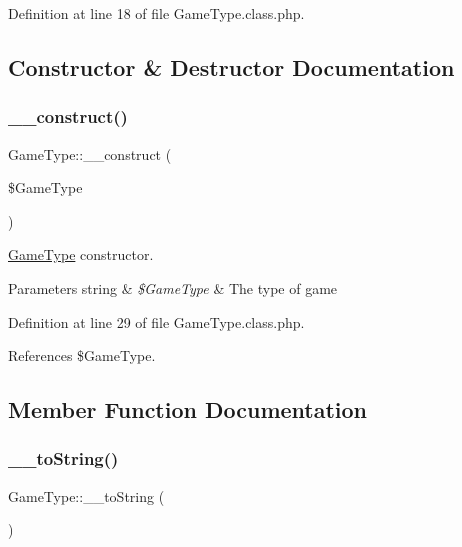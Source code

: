 Definition at line 18 of file Game\+Type.\+class.\+php.



\subsection{Constructor \& Destructor Documentation}
\mbox{\label{class_game_type_acd416aa9bf73a602044ca77ff9af7075}} 
\subsubsection{\texorpdfstring{\+\_\+\+\_\+construct()}{\_\_construct()}}
{\footnotesize\ttfamily Game\+Type\+::\+\_\+\+\_\+construct (\begin{DoxyParamCaption}\item[{}]{\$\+Game\+Type }\end{DoxyParamCaption})}

\hyperlink{class_game_type}{Game\+Type} constructor. 
\begin{DoxyParams}[1]{Parameters}
string & {\em \$\+Game\+Type} & The type of game \\
\hline
\end{DoxyParams}


Definition at line 29 of file Game\+Type.\+class.\+php.



References \$\+Game\+Type.



\subsection{Member Function Documentation}
\mbox{\label{class_game_type_aa44eff666eb42a95f850466ee75b689b}} 
\subsubsection{\texorpdfstring{\+\_\+\+\_\+to\+String()}{\_\_toString()}}
{\footnotesize\ttfamily Game\+Type\+::\+\_\+\+\_\+to\+String (\begin{DoxyParamCaption}{ }\end{DoxyParamCaption})}



